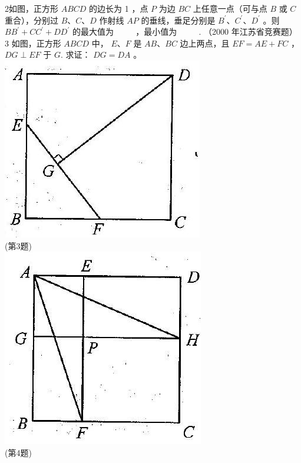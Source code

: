 \documentclass[10pt]{article}
\begin{document}
2如图，正方形 $A B C D$ 的边长为 1 ，点 $P$ 为边 $B C$ 上任意一点（可与点 $B$ 或 $C$ 重合），分别过 $B 、 C 、 D$ 作射线 $A P$ 的垂线，垂足分别是 $B^{\prime} 、 C^{\prime} 、 D^{\prime}$ 。则 $B B^{\prime}+C C^{\prime}+D D^{\prime}$ 的最大值为 $\qquad$ ，最小值为 $\qquad$ . （2000 年江苏省竞赛题）\\
3 如图，正方形 $A B C D$ 中， $E 、 F$ 是 $A B 、 B C$ 边上两点，且 $E F=A E+F C$ ， $D G \perp E F$ 于 $G$. 求证： $D G=D A$ 。\\
\includegraphics[max width=\textwidth, center]{2024_10_30_2c8f45efd4a519b08e1ag-135(1)}\\
(第3题)\\
\includegraphics[max width=\textwidth, center]{2024_10_30_2c8f45efd4a519b08e1ag-135(4)}\\
(第4题)
\end{document}
